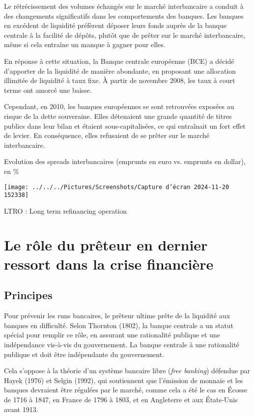 \documentclass[a4paper, 12pt]{report}
\begin{document}
Le rétrécissement des volumes échangés sur le marché interbancaire a conduit à des changements significatifs dans les comportements des banques. Les banques en excédent de liquidité préfèrent déposer leurs fonds auprès de la banque centrale à la facilité de dépôts, plutôt que de prêter sur le marché interbancaire, même si cela entraîne un manque à gagner pour elles. 

En réponse à cette situation, la Banque centrale européenne (BCE) a décidé d'apporter de la liquidité de manière abondante, en proposant une allocation illimitée de liquidité à taux fixe. À partir de novembre 2008, les taux à court terme ont amorcé une baisse. 

Cependant, en 2010, les banques européennes se sont retrouvées exposées au risque de la dette souveraine. Elles détenaient une grande quantité de titres publics dans leur bilan et étaient sous-capitalisées, ce qui entraînait un fort effet de levier. En conséquence, elles refusaient de se prêter sur le marché interbancaire.

Evolution des spreads interbancaires (emprunts en euro vs. emprunts en dollar), en \%

\begin{center}
	\texttt{[image: ../../../Pictures/Screenshots/Capture d'écran 2024-11-20 152338]}
\end{center}

LTRO : Long term refinancing operation

\section{Le rôle du prêteur en dernier ressort dans la crise financière}

\subsection{Principes}

Pour prévenir les runs bancaires, le prêteur ultime prête de la liquidité aux banques en difficulté. Selon Thornton (1802), la banque centrale a un statut spécial pour remplir ce rôle, en assurant une rationalité publique et une indépendance vis-à-vis du gouvernement. La banque centrale à une rationalité publique et doit être indépendante du gouvernement.   

Cela s'oppose à la théorie d'un système bancaire libre (\textit{free banking}) défendue par Hayek (1976) et Selgin (1992), qui soutiennent que l'émission de monnaie et les banques devraient être régulées par le marché, comme cela a été le cas en Écosse de 1716 à 1847, en France de 1796 à 1803, et en Angleterre et aux États-Unis avant 1913. 
\end{document}
